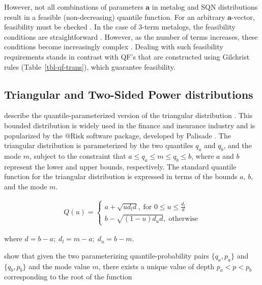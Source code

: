 \documentclass[
  fleqn,
  deca,
  blindrev
]{informs4}
\begin{document}
However, not all combinations of parameters \(\mathbf{a}\) in metalog
and SQN distributions result in a feasible (non-decreasing) quantile
function. For an arbitrary \(\mathbf{a}\)-vector, feasibility must be
checked \citep{keelin2011QuantileParameterizedDistributions}. In the
case of 3-term metalogs, the feasibility conditions are straightforward
\citep{keelin2016MetalogDistributions}. However, as the number of terms
increases, these conditions become increasingly complex
\citep{keelin2017MetalogDistributionsFeasibility}. Dealing with such
feasibility requirements stands in contrast with QF's that are
constructed using Gilchrist rules (Table~\ref{tbl-qf-trans}), which
guarantee feasibility.

\subsection{Triangular and Two-Sided Power
distributions}\label{triangular-and-two-sided-power-distributions}

\citet{kotz2004BetaOtherContinuous} describe the quantile-parameterized
version of the triangular distribution
\citep{johnson1997TriangularDistributionProxy}. This bounded
distribution is widely used in the finance and insurance industry and is
popularized by the @Risk software package, developed by Palisade
\citep{palisadecorporation2009GuideUsingRISK}. The triangular
distribution is parameterized by the two quantiles \(q_{a}\) and
\(q_{b}\), and the mode \(m\), subject to the constraint that
\(a\leq q_a\leq m\leq q_b\leq b\), where \(a\) and \(b\) represent the
lower and upper bounds, respectively. The standard quantile function for
the triangular distribution is expressed in terms of the bounds \(a\),
\(b\), and the mode \(m\).

\[
\begin{gathered}
Q(u)=\begin{cases}
a+\sqrt{ud_ld}, \; \text{for } 0\leq u \leq\frac{d_l}{d}\\
b-\sqrt{(1-u)d_ud}, \; \text{otherwise}
\end{cases}
\end{gathered}
\]

where \(d=b-a;\; d_l=m-a;\; d_u=b-m\).

\citet{kotz2004BetaOtherContinuous} show that given the two
parameterizing quantile-probability pairs \(\{q_a,p_a\}\) and
\(\{q_b,p_b\}\) and the mode value \(m\), there exists a unique value of
depth \(p_a<p<p_b\) corresponding to the root of the function
\end{document}
